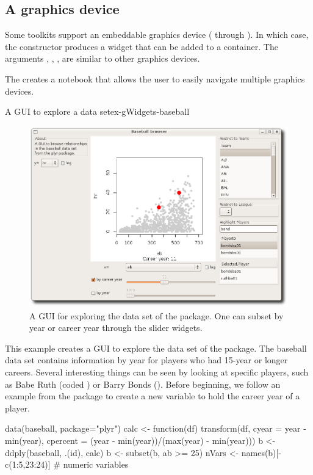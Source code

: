 \subsection{A graphics device}
\label{sec:gWidgets-graphics-device}

Some toolkits support an embeddable graphics device (
through ). In which case, the 
constructor produces a widget that can be added to a container. The
arguments , ,
,  are similar to
other graphics devices.

The  creates a notebook that allows the
user to easily navigate multiple graphics devices.


\begin{example}{A GUI to explore a data set}{ex-gWidgets-baseball}

\begin{figure}
  \centering
  \includegraphics[width=.8\textwidth]{fig-gWidgets-baseball-gui.png}
  \caption{A  GUI for exploring the  data set of the  package. One can subset by year or career year through the slider widgets.}
  \label{fig:ex-gWidgets-baseball}
\end{figure}

This example creates a GUI to explore the  data set of
the  package.  The baseball data set contains information by
year for players who had 15-year or longer careers. Several
interesting things can be seen by looking at specific players, such as
Babe Ruth (coded ) or Barry Bonds ().
Before beginning, we follow an example from the  package to create a
new variable to hold the career year of a player.
\begin{Schunk}
\begin{Sinput}
 data(baseball, package="plyr")
 calc <- function(df) 
   transform(df,
             cyear = year - min(year),
             cpercent = (year - min(year))/(max(year) - min(year)))
 b <- ddply(baseball, .(id), calc)
 b <- subset(b, ab >= 25) 
 nVars <- names(b)[-c(1:5,23:24)]    # numeric variables
\end{Sinput}
\end{Schunk}


\end{example}

